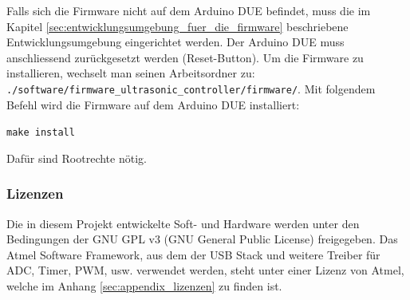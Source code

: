 Falls sich die Firmware nicht auf dem Arduino DUE befindet, muss die im Kapitel \ref{sec:entwicklungsumgebung_fuer_die_firmware} beschriebene Entwicklungsumgebung eingerichtet werden. Der Arduino DUE muss anschliessend zurückgesetzt werden (Reset-Button). Um die Firmware zu installieren, wechselt man seinen Arbeitsordner zu: \texttt{./software/firmware\_ultrasonic\_controller/firmware/}. Mit folgendem Befehl wird die Firmware auf dem Arduino DUE installiert:

\texttt{make install}

Dafür sind Rootrechte nötig.

\subsubsection{Lizenzen}
Die in diesem Projekt entwickelte Soft- und Hardware werden unter den Bedingungen der GNU GPL v3 (GNU General Public License) freigegeben. Das Atmel Software Framework, aus dem der USB Stack und weitere Treiber für ADC, Timer, PWM, usw. verwendet werden, steht unter einer Lizenz von Atmel, welche im Anhang \ref{sec:appendix_lizenzen} zu finden ist.

